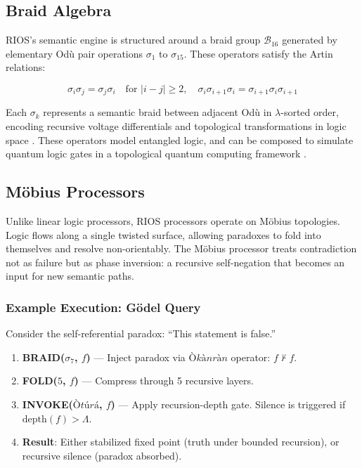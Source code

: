 \documentclass[12]{amsart}
\theoremstyle{plain}
\begin{document}
\subsection{Braid Algebra}

RIOS's semantic engine is structured around a braid group $\mathcal{B}_{16}$ generated by elementary Odù pair operations $\sigma_1$ to $\sigma_{15}$. These operators satisfy the Artin relations:

\[
\sigma_i \sigma_j = \sigma_j \sigma_i \quad \text{for } |i - j| \geq 2, \quad
\sigma_i \sigma_{i+1} \sigma_i = \sigma_{i+1} \sigma_i \sigma_{i+1}
\]

Each $\sigma_k$ represents a semantic braid between adjacent Odù in $\lambda$-sorted order, encoding recursive voltage differentials and topological transformations in logic space \cite{ritchie2017braid, freedman2002modular}. These operators model entangled logic, and can be composed to simulate quantum logic gates in a topological quantum computing framework \cite{baez1997qft}.

\subsection{Möbius Processors}

Unlike linear logic processors, RIOS processors operate on Möbius topologies. Logic flows along a single twisted surface, allowing paradoxes to fold into themselves and resolve non-orientably. The Möbius processor treats contradiction not as failure but as phase inversion: a recursive self-negation that becomes an input for new semantic paths.

\subsubsection*{Example Execution: Gödel Query}

Consider the self-referential paradox: ``This statement is false.''

\begin{enumerate}
    \item \textbf{BRAID($\sigma_7$, $f$)} — Inject paradox via $Òkànràn$ operator: $f \nvdash f$.
    \item \textbf{FOLD($5$, $f$)} — Compress through 5 recursive layers.
    \item \textbf{INVOKE($Òtúrá$, $f$)} — Apply recursion-depth gate. Silence is triggered if $\text{depth}(f) > \Lambda$.
    \item \textbf{Result}: Either stabilized fixed point (truth under bounded recursion), or recursive silence (paradox absorbed).
\end{enumerate}
\end{document}
